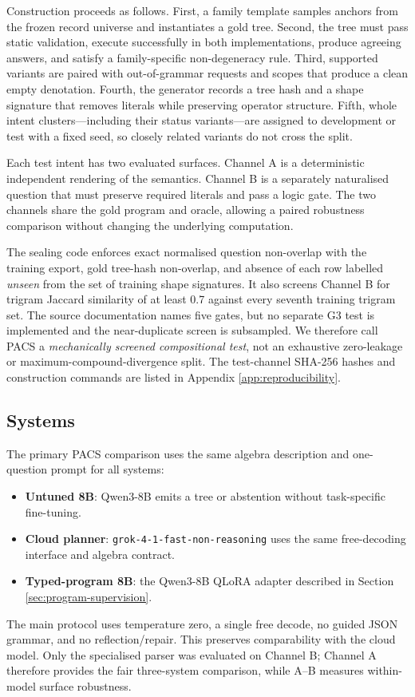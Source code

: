 Construction proceeds as follows.  First, a family template samples anchors from the frozen
record universe and instantiates a gold tree.  Second, the tree must pass static validation,
execute successfully in both implementations, produce agreeing answers, and satisfy a
family-specific non-degeneracy rule.  Third, supported variants are paired with out-of-grammar
requests and scopes that produce a clean empty denotation.  Fourth, the generator records a
tree hash and a shape signature that removes literals while preserving operator structure.
Fifth, whole intent clusters---including their status variants---are assigned to development or
test with a fixed seed, so closely related variants do not cross the split.

Each test intent has two evaluated surfaces.  Channel A is a deterministic independent rendering
of the semantics.  Channel B is a separately naturalised question that must preserve required
literals and pass a logic gate.  The two channels share the gold program and oracle, allowing a
paired robustness comparison without changing the underlying computation.

The sealing code enforces exact normalised question non-overlap with the training export, gold
tree-hash non-overlap, and absence of each row labelled \emph{unseen} from the set of training
shape signatures.  It also screens Channel B for trigram Jaccard similarity of at least 0.7
against every seventh training trigram set.  The source documentation names five gates, but no
separate G3 test is implemented and the near-duplicate screen is subsampled.  We therefore call
PACS a \emph{mechanically screened compositional test}, not an exhaustive zero-leakage or
maximum-compound-divergence split.  The test-channel SHA-256 hashes and construction commands are
listed in Appendix \ref{app:reproducibility}.

\subsection{Systems}

The primary PACS comparison uses the same algebra description and one-question prompt for all
systems:
\begin{itemize}
  \item \textbf{Untuned 8B}: Qwen3-8B emits a tree or abstention without task-specific
  fine-tuning.
  \item \textbf{Cloud planner}: \texttt{grok-4-1-fast-non-reasoning} uses the same free-decoding
  interface and algebra contract.
  \item \textbf{Typed-program 8B}: the Qwen3-8B QLoRA adapter described in Section
  \ref{sec:program-supervision}.
\end{itemize}
The main protocol uses temperature zero, a single free decode, no guided JSON grammar, and no
reflection/repair.  This preserves comparability with the cloud model.  Only the specialised
parser was evaluated on Channel B; Channel A therefore provides the fair three-system
comparison, while A--B measures within-model surface robustness.

